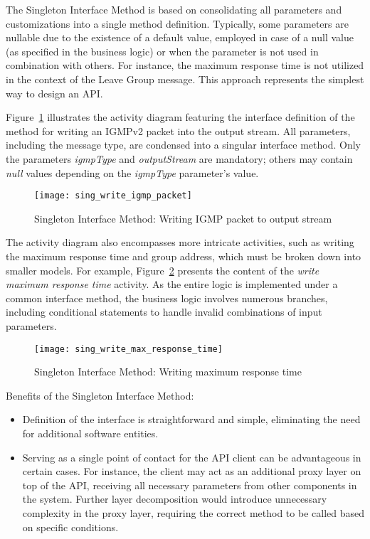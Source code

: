 The Singleton Interface Method is based on consolidating all parameters and customizations into a single
method definition.
Typically, some parameters are nullable due to the existence of a default value, employed in case of a null value
(as specified in the business logic) or when the parameter is not used in combination with others.
For instance, the maximum response time is not utilized in the context of the Leave Group message.
This approach represents the simplest way to design an API\@.

Figure~\ref{fig:sing_write_igmp_packet} illustrates the activity diagram featuring the interface definition
of the method for writing an IGMPv2 packet into the output stream.
All parameters, including the message type, are condensed into a singular interface method.
Only the parameters \textit{igmpType} and \textit{outputStream} are mandatory; others may contain \textit{null} values
depending on the \textit{igmpType} parameter's value.

\begin{figure}[!htb]
    \centering
    \texttt{[image: sing\_write\_igmp\_packet]}
    \caption{Singleton Interface Method: Writing IGMP packet to output stream}
    \label{fig:sing_write_igmp_packet}
\end{figure}

The activity diagram also encompasses more intricate activities, such as writing the maximum response time
and group address, which must be broken down into smaller models.
For example, Figure~\ref{fig:sing_write_max_response_time} presents the content of the
\textit{write maximum response time} activity.
As the entire logic is implemented under a common interface method, the business logic involves numerous branches,
including conditional statements to handle invalid combinations of input parameters.

\begin{figure}[!htb]
    \centering
    \texttt{[image: sing\_write\_max\_response\_time]}
    \caption{Singleton Interface Method: Writing maximum response time}
    \label{fig:sing_write_max_response_time}
\end{figure}

Benefits of the Singleton Interface Method:

\begin{itemize}
    \item
    Definition of the interface is straightforward and simple, eliminating the need for additional software entities.
    \item
    Serving as a single point of contact for the API client can be advantageous in certain cases.
    For instance, the client may act as an additional proxy layer on top of the API,
    receiving all necessary parameters from other components in the system.
    Further layer decomposition would introduce unnecessary complexity in the proxy layer,
    requiring the correct method to be called based on specific conditions.
\end{itemize}


